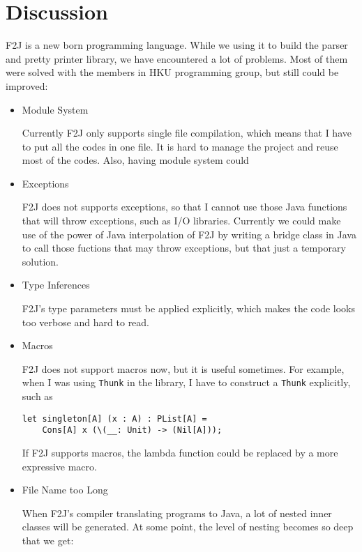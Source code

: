 \chapter{Discussion}

F2J is a new born programming language. While we using it to build the parser and pretty printer library, we have encountered a lot of problems. Most of them were solved with the members in HKU programming group, but still could be improved:

\begin{itemize}
\item Module System

Currently F2J only supports single file compilation, which means that I have to put all the codes in one file. It is hard to manage the project and reuse most of the codes. Also, having module system could

\item Exceptions

F2J does not supports exceptions, so that I cannot use those Java functions that will throw exceptions, such as I/O libraries. Currently we could make use of the power of Java interpolation of F2J by writing a bridge class in Java to call those fuctions that may throw exceptions, but that just a temporary solution.

\item Type Inferences

F2J's type parameters must be applied explicitly, which makes the code looks too verbose and hard to read.

\item Macros

F2J does not support macros now, but it is useful sometimes. For example, when I was using \texttt{Thunk} in the library, I have to construct a \texttt{Thunk} explicitly, such as

\begin{lstlisting}
let singleton[A] (x : A) : PList[A] =
    Cons[A] x (\(__: Unit) -> (Nil[A]));
\end{lstlisting}

If F2J supports macros, the lambda function could be replaced by a more expressive macro.



\item File Name too Long

When F2J's compiler translating programs to Java, a lot of nested inner classes will be generated. At some point, the level of nesting becomes so deep that we get:


\end{itemize}
